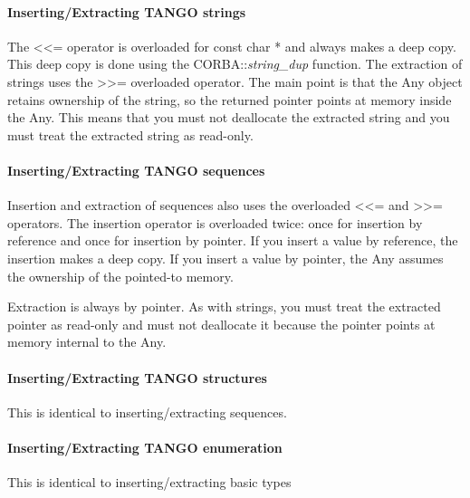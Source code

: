 \paragraph{Inserting/Extracting TANGO strings}

The <\textcompwordmark{}<= operator is overloaded for const char {*}
and always makes a deep copy. This deep copy is done using the CORBA::\emph{string\_dup}
function. The extraction of strings uses the >\textcompwordmark{}>=
overloaded operator. The main point is that the Any object
retains ownership of the string, so the returned pointer points at
memory inside the Any. This means that you must not
deallocate the extracted string and you must treat the extracted string
as read-only.

\paragraph{Inserting/Extracting TANGO sequences}

Insertion and extraction of sequences also uses the
overloaded <\textcompwordmark{}<= and >\textcompwordmark{}>= operators.
The insertion operator is overloaded twice: once for insertion by
reference and once for insertion by pointer. If you insert a value
by reference, the insertion makes a deep copy. If you insert a value
by pointer, the Any assumes the ownership of the pointed-to
memory. 

Extraction is always by pointer. As with strings, you must treat the
extracted pointer as read-only and must not deallocate it because
the pointer points at memory internal to the Any.

\paragraph{Inserting/Extracting TANGO structures}

This is identical to inserting/extracting sequences.

\paragraph{Inserting/Extracting TANGO enumeration}

This is identical to inserting/extracting basic types

